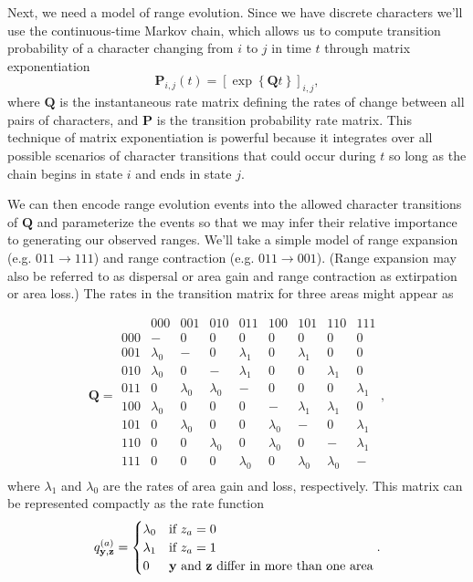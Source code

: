 Next, we need a model of range evolution.
Since we have discrete characters we'll use the continuous-time Markov chain, which allows us to compute transition probability of a character changing from $i$ to $j$ in time $t$ through matrix exponentiation
\[
\mathbf{P}_{i,j}(t) = \left[ \exp \left\lbrace \mathbf{Q}t \right\rbrace \right]_{i,j},
\]
where $\textbf{Q}$ is the instantaneous rate matrix defining the rates of change between all pairs of characters, and $\textbf{P}$ is the transition probability rate matrix.
This technique of matrix exponentiation is powerful because it integrates over all possible scenarios of character transitions that could occur during $t$ so long as the chain begins in state $i$ and ends in state $j$.

We can then encode range evolution events into the allowed character transitions of $\textbf{Q}$ and parameterize the events so that we may infer their relative importance to generating our observed ranges.
We'll take a simple model of range expansion (e.g. $011 \rightarrow 111$) and range contraction (e.g. $011 \rightarrow 001$).
(Range expansion may also be referred to as dispersal or area gain and range contraction as extirpation or area loss.)
The rates in the transition matrix for three areas might appear as

\[
\textbf{Q} = 
	\begin{array}{r|cccccccc}
		& 000 & 001 & 010 & 011 & 100 & 101 & 110 & 111 \\
		\hline
		000 & - & 0 & 0 & 0 & 0 & 0 & 0 & 0 \\
		001 & \lambda_0 & - & 0 & \lambda_1 & 0 & \lambda_1 & 0 & 0 \\
		010 & \lambda_0 & 0 & - & \lambda_1 & 0 & 0 & \lambda_1 & 0 \\
		011 & 0 & \lambda_0 & \lambda_0 & - & 0 & 0 & 0 & \lambda_1 \\
		100 & \lambda_0 & 0 & 0 & 0 & - & \lambda_1 & \lambda_1 & 0 \\
		101 & 0 & \lambda_0 & 0 & 0 & \lambda_0 & - & 0 & \lambda_1 \\
		110 & 0 & 0 & \lambda_0 & 0 & \lambda_0 & 0 & - & \lambda_1 \\
		111 & 0 & 0 & 0 & \lambda_0 & 0 & \lambda_0 & \lambda_0 & - \\								
	\end{array},
\]
where $\lambda_1$ and $\lambda_0$ are the rates of area gain and loss, respectively.
This matrix can be represented compactly as the rate function
\[
q^{(a)}_{\textbf{y},\textbf{z}} =
\begin{cases}
\lambda_0 & \text{if $z_a=0$}  \\
\lambda_1 & \text{if $z_a=1$} \\
0 & \text{\textbf{y} and \textbf{z} differ in more than one area}
\end{cases}.
\]

